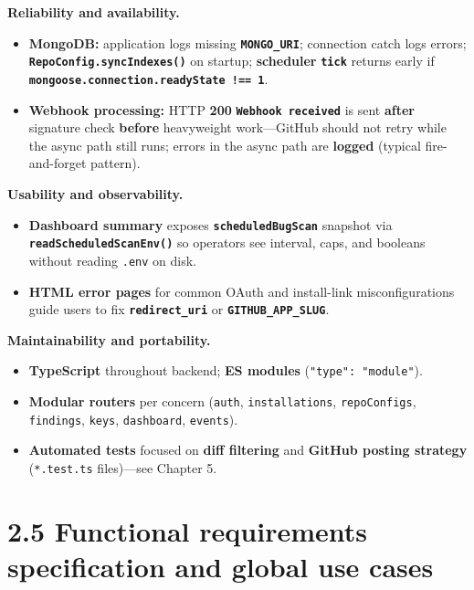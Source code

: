 \documentclass[11pt,a4paper]{report}
\begin{document}
\textbf{Reliability and availability.}


\begin{itemize}
\item \textbf{MongoDB:} application logs missing \textbf{\texttt{MONGO\_URI}}; connection catch logs errors; \textbf{\texttt{RepoConfig.syncIndexes()}} on startup; \textbf{scheduler} \textbf{\texttt{tick}} returns early if \textbf{\texttt{mongoose.connection.readyState !== 1}}.
\item \textbf{Webhook processing:} HTTP \textbf{200} \textbf{\texttt{Webhook received}} is sent \textbf{after} signature check \textbf{before} heavyweight work—GitHub should not retry while the async path still runs; errors in the async path are \textbf{logged} (typical fire-and-forget pattern).
\end{itemize}


\textbf{Usability and observability.}


\begin{itemize}
\item \textbf{Dashboard summary} exposes \textbf{\texttt{scheduledBugScan}} snapshot via \textbf{\texttt{readScheduledScanEnv()}} so operators see interval, caps, and booleans without reading \texttt{.env} on disk.
\item \textbf{HTML error pages} for common OAuth and install-link misconfigurations guide users to fix \textbf{\texttt{redirect\_uri}} or \textbf{\texttt{GITHUB\_APP\_SLUG}}.
\end{itemize}


\textbf{Maintainability and portability.}


\begin{itemize}
\item \textbf{TypeScript} throughout backend; \textbf{ES modules} (\texttt{"type": "module"}).
\item \textbf{Modular routers} per concern (\texttt{auth}, \texttt{installations}, \texttt{repoConfigs}, \texttt{findings}, \texttt{keys}, \texttt{dashboard}, \texttt{events}).
\item \textbf{Automated tests} focused on \textbf{diff filtering} and \textbf{GitHub posting strategy} (\texttt{*.test.ts} files)—see Chapter 5.
\end{itemize}


\section{2.5 Functional requirements specification and global use cases}
\end{document}
